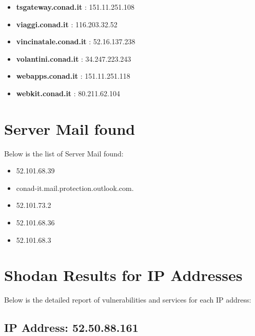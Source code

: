 \documentclass{article}
\begin{document}
\begin{itemize}
        \item \textbf{ tsgateway.conad.it }: 151.11.251.108
    
        \item \textbf{ viaggi.conad.it }: 116.203.32.52
    
        \item \textbf{ vincinatale.conad.it }: 52.16.137.238
    
        \item \textbf{ volantini.conad.it }: 34.247.223.243
    
        \item \textbf{ webapps.conad.it }: 151.11.251.118
    
        \item \textbf{ webkit.conad.it }: 80.211.62.104
    
\end{itemize}

\section*{Server Mail found}

Below is the list of Server Mail found:

\begin{itemize}
    
        \item 52.101.68.39
    
        \item conad-it.mail.protection.outlook.com.
    
        \item 52.101.73.2
    
        \item 52.101.68.36
    
        \item 52.101.68.3
    
\end{itemize}

\section*{Shodan Results for IP Addresses}

Below is the detailed report of vulnerabilities and services for each IP address:



\subsection*{IP Address: 52.50.88.161}
\end{document}
